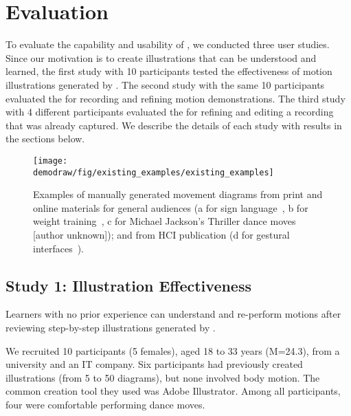
\section{Evaluation}
To evaluate the capability and usability of \systemname{}, we conducted three user studies.
%
Since our motivation is to create illustrations that can be understood and learned, the first study with 10 participants tested the effectiveness of motion illustrations generated by \systemname{}.
%
The second study with the same 10 participants evaluated the \phaseI{} for recording and refining motion demonstrations.
%
The third study with 4 different participants evaluated the \phaseII{} for refining and editing a recording that was already captured.
%
We describe the details of each study with results in the sections below.


\begin{figure}[t]
  \centering
  \texttt{[image: \\demodraw/fig/existing\_examples/existing\_examples]}
  \caption{Examples of manually generated movement diagrams from print and online materials for general audiences (a for sign language~\protect\cite{corum:2012:sign}, b for weight training~\protect\cite{anderson:2002:training}, c for Michael Jackson's Thriller dance moves [author unknown]); and from HCI publication (d for gestural interfaces~\protect\cite{cohn2012humantenna}).}
  \label{fig:existing_examples}
\end{figure}

\subsection{Study 1: Illustration Effectiveness}

Learners with no prior experience can understand and re-perform motions after reviewing step-by-step illustrations generated by \systemname{}.

We recruited 10 participants (5 females), aged 18 to 33 years (M=24.3), from a university and an IT company.
%
Six participants had previously created illustrations (from 5 to 50 diagrams), but none involved body motion. The common creation tool they used was Adobe Illustrator. %
%
Among all participants, four were comfortable performing dance moves.

